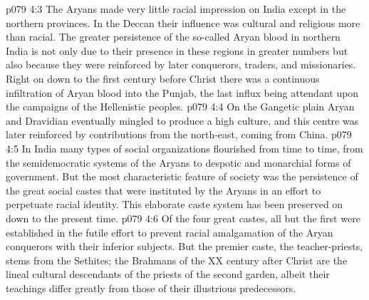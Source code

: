 \vs p079 4:3 The Aryans made very little racial impression on India except in the northern provinces. In the Deccan their influence was cultural and religious more than racial. The greater persistence of the so\hyp{}called Aryan blood in northern India is not only due to their presence in these regions in greater numbers but also because they were reinforced by later conquerors, traders, and missionaries. Right on down to the first century before Christ there was a continuous infiltration of Aryan blood into the Punjab, the last influx being attendant upon the campaigns of the Hellenistic peoples.
\vs p079 4:4 On the Gangetic plain Aryan and Dravidian eventually mingled to produce a high culture, and this centre was later reinforced by contributions from the north\hyp{}east, coming from China.
\vs p079 4:5 In India many types of social organizations flourished from time to time, from the semidemocratic systems of the Aryans to despotic and monarchial forms of government. But the most characteristic feature of society was the persistence of the great social castes that were instituted by the Aryans in an effort to perpetuate racial identity. This elaborate caste system has been preserved on down to the present time.
\vs p079 4:6 Of the four great castes, all but the first were established in the futile effort to prevent racial amalgamation of the Aryan conquerors with their inferior subjects. But the premier caste, the teacher\hyp{}priests, stems from the Sethites; the Brahmans of the XX century after Christ are the lineal cultural descendants of the priests of the second garden, albeit their teachings differ greatly from those of their illustrious predecessors.
